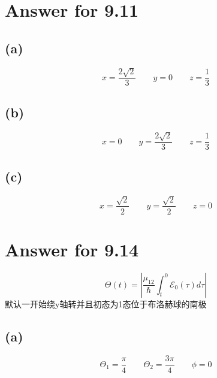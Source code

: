 \documentclass[twoside]{article}
\begin{document}

\section*{Answer for 9.11}

\subsection*{(a)}
\begin{equation*}
    x = \frac{2\sqrt{2}}{3} \qquad y = 0 \qquad z = \frac{1}{3}
\end{equation*}
\subsection*{(b)}
\begin{equation*}
    x = 0 \qquad y = \frac{2\sqrt{2}}{3} \qquad z = \frac{1}{3}
\end{equation*}
\subsection*{(c)}
\begin{equation*}
    x = \frac{\sqrt{2}}{2} \qquad y = \frac{\sqrt{2}}{2} \qquad z = 0
\end{equation*}

\section*{Answer for 9.14}

$$
    \Theta(t) = |\frac{\mu_{12}}{\hbar} \int_{t}^{0} \mathcal{E}_0 (\tau) d\tau|
$$
默认一开始绕y轴转并且初态为1态位于布洛赫球的南极
\subsection*{(a)}

$$\Theta_1 = \frac{\pi}{4} \qquad \Theta_2 = \frac{3\pi}{4} \qquad \phi = 0$$
\end{document}
